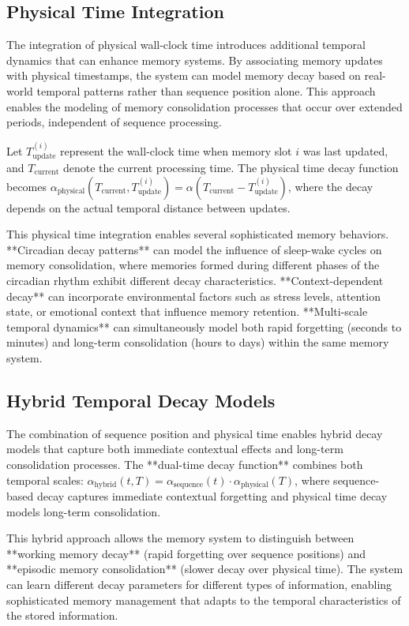 \documentclass{article}
\begin{document}
\subsection{Physical Time Integration}

The integration of physical wall-clock time introduces additional temporal dynamics that can enhance memory systems. By associating memory updates with physical timestamps, the system can model memory decay based on real-world temporal patterns rather than sequence position alone. This approach enables the modeling of memory consolidation processes that occur over extended periods, independent of sequence processing.

Let $T_{\text{update}}^{(i)}$ represent the wall-clock time when memory slot $i$ was last updated, and $T_{\text{current}}$ denote the current processing time. The physical time decay function becomes $\alpha_{\text{physical}}(T_{\text{current}}, T_{\text{update}}^{(i)}) = \alpha(T_{\text{current}} - T_{\text{update}}^{(i)})$, where the decay depends on the actual temporal distance between updates.

This physical time integration enables several sophisticated memory behaviors. **Circadian decay patterns** can model the influence of sleep-wake cycles on memory consolidation, where memories formed during different phases of the circadian rhythm exhibit different decay characteristics. **Context-dependent decay** can incorporate environmental factors such as stress levels, attention state, or emotional context that influence memory retention. **Multi-scale temporal dynamics** can simultaneously model both rapid forgetting (seconds to minutes) and long-term consolidation (hours to days) within the same memory system.

\subsection{Hybrid Temporal Decay Models}

The combination of sequence position and physical time enables hybrid decay models that capture both immediate contextual effects and long-term consolidation processes. The **dual-time decay function** combines both temporal scales: $\alpha_{\text{hybrid}}(t, T) = \alpha_{\text{sequence}}(t) \cdot \alpha_{\text{physical}}(T)$, where sequence-based decay captures immediate contextual forgetting and physical time decay models long-term consolidation.

This hybrid approach allows the memory system to distinguish between **working memory decay** (rapid forgetting over sequence positions) and **episodic memory consolidation** (slower decay over physical time). The system can learn different decay parameters for different types of information, enabling sophisticated memory management that adapts to the temporal characteristics of the stored information.
\end{document}
